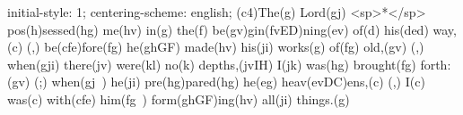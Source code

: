 initial-style: 1;
centering-scheme: english;
(c4)The(g) Lord(gj) <sp>*</sp> pos(h)sessed(hg)  me(hv) in(g) the(f) be(gv)gin(fvED)ning(ev) of(d) his(ded) way,(c) (,) be(cfe)fore(fg) he(ghGF) made(hv) his(ji) works(g) of(fg) old,(gv) (,) when(gji) there(jv) were(kl) no(k) depths,(jvIH) I(jk) was(hg) brought(fg) forth:(gv) (;) when(gj~) he(ji) pre(hg)pared(hg) he(eg) heav(evDC)ens,(c) (,) I(c) was(c) with(cfe) him(fg~) form(ghGF)ing(hv) all(ji) things.(g)
